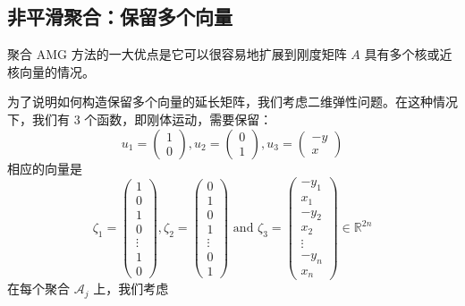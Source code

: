 \documentclass[12pt]{acta_2011xz}
\begin{document}
   \subsection{非平滑聚合：保留多个向量  }       \label{s:P-many}    聚合 AMG 方法的一大优点是它可以很容易地扩展到刚度矩阵    $A$    具有多个核或近核向量的情况。  

为了说明如何构造保留多个向量的延长矩阵，我们考虑二维弹性问题。在这种情况下，我们有 3 个函数，即刚体运动，需要保留：
   $$
u_1=
\begin{pmatrix}
  1 \\ 
0
\end{pmatrix}, 
u_2=
\begin{pmatrix}
  0 \\ 
1
\end{pmatrix}, 
u_3=
\begin{pmatrix}
-y \\ 
x
\end{pmatrix}
$$    相应的向量是
   $$
\zeta_1=
\begin{pmatrix}
  1 \\ 
0 \\ 
  1 \\ 
0 \\ 
\vdots \\ 
1 \\ 
0
\end{pmatrix}, 
\zeta_2=
\begin{pmatrix}
0 \\ 
1 \\ 
0 \\ 
1 \\ 
\vdots \\ 
0 \\ 
1
\end{pmatrix} \mbox{ and }
\zeta_3=
\begin{pmatrix}
-y_1 \\ 
x_1 \\ 
-y_2 \\ 
x_2 \\ 
\vdots \\ 
-y_n \\ 
x_n
\end{pmatrix}\in \mathbb R^{2n}
$$    在每个聚合    $\mathcal A_j$    上，我们考虑
\end{document}
